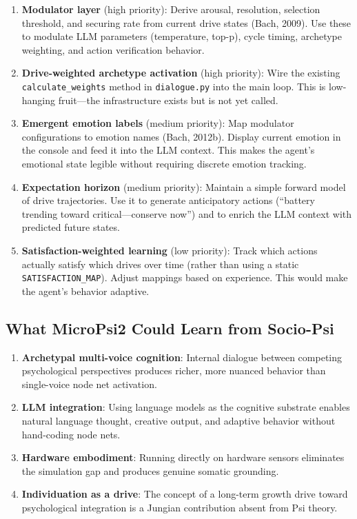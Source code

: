 \documentclass[11pt,letterpaper]{article}
\begin{document}
\begin{enumerate}
  \item \textbf{Modulator layer} (high priority): Derive arousal, resolution,
    selection threshold, and securing rate from current drive states (Bach,
    2009). Use these to modulate LLM parameters (temperature, top-p), cycle
    timing, archetype weighting, and action verification behavior.

  \item \textbf{Drive-weighted archetype activation} (high priority): Wire
    the existing \texttt{calculate\_weights} method in \texttt{dialogue.py}
    into the main loop. This is low-hanging fruit---the infrastructure
    exists but is not yet called.

  \item \textbf{Emergent emotion labels} (medium priority): Map modulator
    configurations to emotion names (Bach, 2012b). Display current emotion
    in the console and feed it into the LLM context. This makes the agent's
    emotional state legible without requiring discrete emotion tracking.

  \item \textbf{Expectation horizon} (medium priority): Maintain a simple
    forward model of drive trajectories. Use it to generate anticipatory
    actions (``battery trending toward critical---conserve now'') and to
    enrich the LLM context with predicted future states.

  \item \textbf{Satisfaction-weighted learning} (low priority): Track which
    actions actually satisfy which drives over time (rather than using
    a static \texttt{SATISFACTION\_MAP}). Adjust mappings based on
    experience. This would make the agent's behavior adaptive.
\end{enumerate}

\subsection{What MicroPsi2 Could Learn from Socio-Psi}

\begin{enumerate}
  \item \textbf{Archetypal multi-voice cognition}: Internal dialogue
    between competing psychological perspectives produces richer, more
    nuanced behavior than single-voice node net activation.

  \item \textbf{LLM integration}: Using language models as the cognitive
    substrate enables natural language thought, creative output, and
    adaptive behavior without hand-coding node nets.

  \item \textbf{Hardware embodiment}: Running directly on hardware
    sensors eliminates the simulation gap and produces genuine somatic
    grounding.

  \item \textbf{Individuation as a drive}: The concept of a long-term
    growth drive toward psychological integration is a Jungian
    contribution absent from Psi theory.
\end{enumerate}
\end{document}

